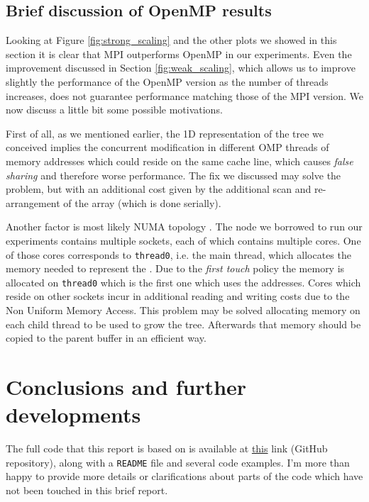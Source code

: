 \documentclass{article}
\begin{document}
\subsection{Brief discussion of OpenMP results}
Looking at Figure \ref{fig:strong_scaling} and the other plots we showed in this
section it is clear that MPI outperforms OpenMP in our experiments. Even the
improvement discussed in Section \ref{fig:weak_scaling}, which allows us to
improve slightly the performance of the OpenMP version as the number of threads
increases, does not guarantee performance matching those of the MPI version. We
now discuss a little bit some possible motivations.

First of all, as we mentioned earlier, the 1D representation of the tree we
conceived implies the concurrent modification in different OMP threads of
memory addresses which could reside on the same cache line, which causes
\emph{false sharing} and therefore worse performance. The fix we discussed
may solve the problem, but with an additional cost given by the additional scan
and re-arrangement of the array (which is done serially).

Another factor is most likely NUMA topology \cite{hager2010introduction}. The
node we borrowed to run our experiments contains multiple sockets, each of which
contains multiple cores.
One of those cores corresponds to \texttt{thread0}, i.e. the main thread, which
allocates the memory needed to represent the \kdtree{}. Due to the
\emph{first touch} policy the memory is allocated on \texttt{thread0} which is
the first one which uses the addresses. Cores which reside on other sockets
incur in additional reading and writing costs due to the Non Uniform Memory
Access. This problem may be solved allocating memory on each child thread to be
used to grow the tree. Afterwards that memory should be copied to the parent
buffer in an efficient way.

\section{Conclusions and further developments}
The full code that this report is based on is available at
\href{https://github.com/fAndreuzzi/parallel-kd-tree}{this} link (GitHub
repository), along with a \texttt{README} file and several code examples. I'm
more than happy to provide more details or clarifications about parts of the
code which have not been touched in this brief report.
\end{document}
